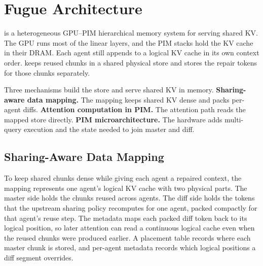 
\section{Fugue Architecture}
\label{sec:design}

\Fugue{} is a heterogeneous GPU--PIM hierarchical memory
system for serving shared KV.
The GPU runs most of the linear layers, and the PIM stacks
hold the KV cache in their DRAM.
Each agent still appends to a logical KV cache in its own
context order.
\Fugue{} keeps reused chunks in a shared physical store and
stores the repair tokens for those chunks separately.

Three mechanisms build the store and serve shared KV in
memory.
\textbf{Sharing-aware data mapping.}
The mapping keeps shared KV dense and packs per-agent diffs.
\textbf{Attention computation in PIM.}
The attention path reads the mapped store directly.
\textbf{PIM microarchitecture.}
The hardware adds multi-query execution and the state needed
to join master and diff.

\subsection{Sharing-Aware Data Mapping}
\label{sec:layout-dim}

To keep shared chunks dense while giving each agent a
repaired context, the mapping represents one agent's logical
KV cache with two physical parts.
The master side holds the chunks reused across agents.
The diff side holds the tokens that the upstream sharing
policy recomputes for one agent, packed compactly for that
agent's reuse step.
The metadata maps each packed diff token back to its logical
position, so later attention can read a continuous logical
cache even when the reused chunks were produced earlier.
A placement table records where each master chunk is stored,
and per-agent metadata records which logical positions a
diff segment overrides.


